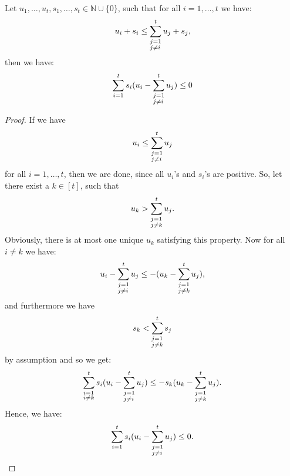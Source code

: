 \begin{lem}\label{lemma8}
Let \(u_1,\ldots,u_t,s_1,\ldots,s_t\in\mathbb{N}\cup\{0\}\), such that for all \(i=1,\ldots,t\) we have:
\[
u_i+s_i\leq\sum_{\begin{subarray}{l}j=1\\ j\neq i\end{subarray}}^tu_j+s_j,
\]
then we have:
\[
\sum\limits_{i=1}^ts_i(u_i-\sum_{\begin{subarray}{l}j=1\\ j\neq i\end{subarray}}^tu_j)\leq 0
\]
\begin{proof}
If we have
\[
u_i\leq\sum_{\begin{subarray}{l}j=1\\ j\neq i\end{subarray}}^tu_j
\]
for all \(i=1,\ldots,t\), then we are done, since all \(u_i\)'s and \(s_i\)'s are positive. So, let there exist a \(k\in[t]\), such that
\[
u_k>\sum_{\begin{subarray}{l}j=1\\ j\neq k\end{subarray}}^tu_j.
\]
Obviously, there is at most one unique \(u_k\) satisfying this property. Now for all \(i\neq k\) we have:
\[
u_i-\sum_{\begin{subarray}{l}j=1\\ j\neq i\end{subarray}}^tu_j\leq -(u_k-\sum_{\begin{subarray}{l}j=1\\ j\neq k\end{subarray}}^tu_j),
\]
and furthermore we have
\[
s_k<\sum_{\begin{subarray}{l}j=1\\ j\neq k\end{subarray}}^ts_j
\]
by assumption and so we get:
\[
\sum_{\begin{subarray}{l}i=1\\ i\neq k\end{subarray}}^ts_i(u_i-\sum_{\begin{subarray}{l}j=1\\ j\neq i\end{subarray}}^tu_j)\leq-s_k(u_k-\sum_{\begin{subarray}{l}j=1\\ j\neq k\end{subarray}}^tu_j).
\]
Hence, we have:
\[
\sum\limits_{i=1}^ts_i(u_i-\sum_{\begin{subarray}{l}j=1\\ j\neq i\end{subarray}}^tu_j)\leq 0.
\]
\end{proof}
\end{lem}

